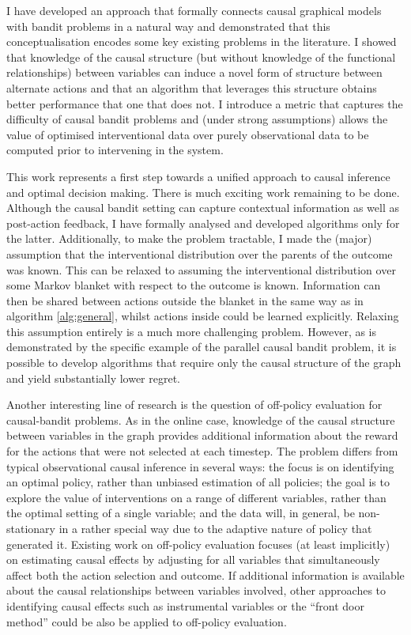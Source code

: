 \documentclass[11pt,a4paper,twoside]{report}
\newcommand{\quotes}[1]{``#1''}
\theoremstyle{plain}
\theoremstyle{definition}
\begin{document}
I have developed an approach that formally connects causal graphical models with bandit problems in a natural way and demonstrated that this conceptualisation encodes some key existing problems in the literature. I showed that knowledge of the causal structure (but without knowledge of the functional relationships) between variables can induce a novel form of structure between alternate actions and that an algorithm that leverages this structure obtains better performance that one that does not. I introduce a metric that captures the difficulty of causal bandit problems and (under strong assumptions) allows the value of optimised interventional data over purely observational data to be computed prior to intervening in the system.

This work represents a first step towards a unified approach to causal inference and optimal decision making. There is much exciting work remaining to be done. Although the causal bandit setting can capture contextual information as well as post-action feedback, I have formally analysed and developed algorithms only for the latter. Additionally, to make the problem tractable, I made the (major) assumption that the interventional distribution over the parents of the outcome was known. This can be relaxed to assuming the interventional distribution over some Markov blanket with respect to the outcome is known. Information can then be shared between actions outside the blanket in the same way as in algorithm \ref{alg:general}, whilst actions inside could be learned explicitly. Relaxing this assumption entirely is a much more challenging problem. However, as is demonstrated by the specific example of the parallel causal bandit problem, it is possible to develop algorithms that require only the causal structure of the graph and yield substantially lower regret.

Another interesting line of research is the question of off-policy evaluation for causal-bandit problems. As in the online case, knowledge of the causal structure between variables in the graph provides additional information about the reward for the actions that were not selected at each timestep. The problem differs from typical observational causal inference in several ways: the focus is on identifying an optimal policy, rather than unbiased estimation of all policies; the goal is to explore the value of interventions on a range of different variables, rather than the optimal setting of a single variable; and the data will, in general, be non-stationary in a rather special way due to the adaptive nature of policy that generated it. Existing work on off-policy evaluation focuses (at least implicitly) on estimating causal effects by adjusting for all variables that simultaneously affect both the action selection and outcome. If additional information is available about the causal relationships between variables involved, other approaches to identifying causal effects such as instrumental variables or the \quotes{front door method} \citep{Pearl2000} could be also be applied to off-policy evaluation. 
\end{document}
